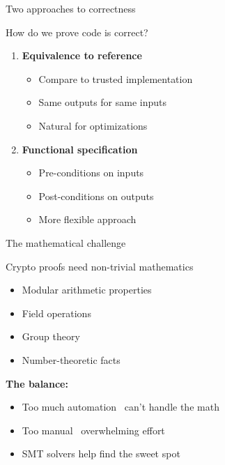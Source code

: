 \documentclass[aspectratio=169, lualatex, handout]{beamer}
\begin{document}
\begin{frame}{Two approaches to correctness}
	\begin{center}
		\Large
		How do we prove code is correct?
	\end{center}
	\vspace{1em}
	\begin{enumerate}
		\item \textbf{Equivalence to reference}
		      \begin{itemize}
			      \item Compare to trusted implementation
			      \item Same outputs for same inputs
			      \item Natural for optimizations
		      \end{itemize}
		      \vspace{0.5em}
		\item \textbf{Functional specification}
		      \begin{itemize}
			      \item Pre-conditions on inputs
			      \item Post-conditions on outputs
			      \item More flexible approach
		      \end{itemize}
	\end{enumerate}
\end{frame}

\begin{frame}{The mathematical challenge}
	\begin{center}
		\Large
		Crypto proofs need non-trivial mathematics
	\end{center}
	\vspace{1em}
	\begin{itemize}
		\item Modular arithmetic properties
		\item Field operations
		\item Group theory
		\item Number-theoretic facts
	\end{itemize}
	\vspace{0.5em}
	\textbf{The balance:}
	\begin{itemize}
		\item Too much automation \rightarrow\ can't handle the math
		\item Too manual \rightarrow\ overwhelming effort
		\item SMT solvers help find the sweet spot
	\end{itemize}
\end{frame}
\end{document}
